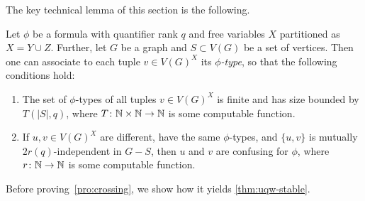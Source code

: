 \medskip
The key technical lemma of this section is the following.

\begin{proposition}\label{pro:crossing}	
	Let $\phi$ be a formula with
 quantifier rank $q$ and
   free variables $X$
 partitioned as $X=Y\cup Z$. Further, let $G$ be a graph and $S\subset V(G)$ be a set of vertices.
Then one can associate to each tuple $v\in V(G)^X$
its \emph{$\phi$-type}, so that the following conditions 
hold:
	 \begin{enumerate}[(1)]
	 	\item\label{c:number} The  set of  $\phi$-types  of all tuples $v\in V(G)^X$  is finite and has size bounded by 
    $T(|S|,q)$, where $T\colon \mathbb{N}\times \mathbb{N}\to \mathbb{N}$ is some computable function.
		

		
	 	\item\label{c:confusing}
  If $u,v\in V(G)^X$ are different, have the same $\phi$-types, and $\{u,v\}$ is mutually $2r(q)$-independent in $G-S$, then $u$ and $v$ are confusing for $\phi$, where
  $r\colon \mathbb{N} \to \mathbb{N}$ is some computable function.
	 \end{enumerate}
\end{proposition}

Before proving~\cref{pro:crossing}, we show how it yields  \cref{thm:uqw-stable}. 

